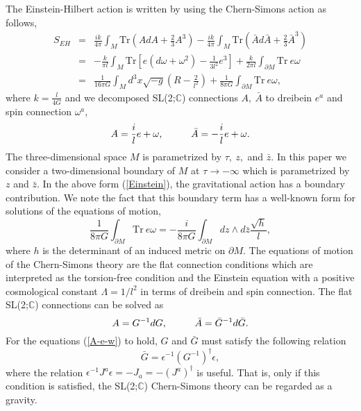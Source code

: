 \documentclass[a4paper,11pt]{article}
\begin{document}
The Einstein-Hilbert action is written by using the Chern-Simons action 
as follows,
\begin{eqnarray}
\label{Einstein}
S_{EH} &=& 
   \frac{ik}{4\pi}\int_M \mbox{Tr}\left(AdA+\frac23 A^3 \right)
    -\frac{ik}{4\pi}\int_M \mbox{Tr}\left(\bar{A}d\bar{A}
       +\frac23 \bar{A}^3 \right) \nonumber \\
  &=& -\frac{k}{\pi l}\int_M \mbox{Tr}\left[e\left(d\omega+\omega^2\right)
            -\frac{1}{3l^2}e^3\right]
               +\frac{k}{2\pi l}\int_{\partial M} \mbox{Tr} \ e \omega 
       \nonumber \\
  &=& \frac{1}{16\pi G}\int_M d^3x \sqrt{-g}\left(R-\frac{2}{l^2}\right)
       +\frac{1}{8\pi G}\int_{\partial M} \mbox{Tr} \ e \omega,
\end{eqnarray}
where $k=\frac{l}{4G}$ and we decomposed SL(2;$\mathbb{C}$) connections 
$A, \ \bar{A}$ to dreibein $e^a$ and spin connection $\omega^a$,
\begin{equation}
\label{A-e-w}
A=\frac{i}{l}e + \omega, \hspace{10mm}
\bar{A}=-\frac{i}{l}e + \omega.
\end{equation}
The three-dimensional space $M$ is parametrized by 
$\tau, \ z,$ and $\bar{z}$.
In this paper we consider a two-dimensional boundary of $M$ 
at $\tau \longrightarrow -\infty$ which is parametrized 
by $z$ and $\bar{z}$.
In the above form (\ref{Einstein}), the gravitational action 
has a boundary contribution.
We note the fact that this boundary term has a well-known form 
for solutions of the equations of motion,
\begin{equation}
\label{b-term}
 \frac{1}{8\pi G}\int_{\partial M} \mbox{Tr} \ e \omega 
  = -\frac{i}{8\pi G}\int_{\partial M}dz\wedge d\bar{z}
      \frac{\sqrt{h}}{l},
\end{equation}
where $h$ is the determinant of an induced metric on $\partial M$.
The equations of motion of the Chern-Simons theory are the flat
connection conditions which are interpreted as the torsion-free
condition and the Einstein equation with a positive cosmological constant 
$\Lambda=1/l^2$ in terms of dreibein and spin connection.
The flat SL(2;$\mathbb{C}$) connections can be solved as  
\begin{equation}
\label{A-G}
A=G^{-1}dG, \hspace{10mm} 
\bar{A}=\bar{G}^{-1}d\bar{G}.
\end{equation}
For the equations (\ref{A-e-w}) to hold,
$G$ and $\bar{G}$ must satisfy the following relation 
\begin{equation}
\label{G-G}
\bar{G}=\epsilon^{-1} \left(G^{-1}\right)^\dagger \epsilon,
\end{equation}
where the relation 
$\epsilon^{-1} J^a \epsilon=-J_a=-\left(J^a\right)^\dagger$
is useful.
That is, only if this condition is satisfied, the SL(2;$\mathbb{C}$) 
Chern-Simons theory can be regarded as a gravity.
\end{document}
